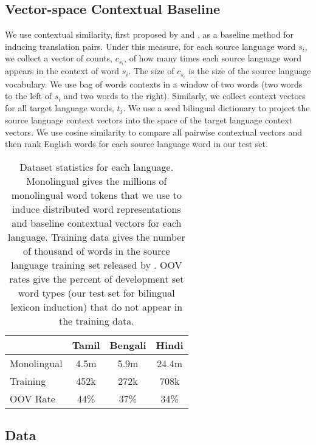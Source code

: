 \documentclass[11pt]{article}
\begin{document}
\subsection{Vector-space Contextual Baseline}\label{sec:contextbaseline}
We use contextual similarity, first proposed by  and , as a baseline method for inducing translation pairs. 
Under this measure, for each source language word $s_i$, we collect a vector of counts, $c_{s_i}$, of how many times each source language word appears in the context of word $s_i$. 
The size of $c_{s_i}$ is the size of the source language vocabulary.
We use bag of words contexts in a window of two words (two words to the left of $s_i$ and two words to the right). 
Similarly, we collect context vectors for all target language words, $t_j$. 
We use a seed bilingual dictionary to project the source language context vectors into the space of the target language context vectors.
We use cosine similarity to compare all pairwise contextual vectors and then rank English words for each source language word in our test set.


\begin{table}
\vspace{-.25cm}
\small
\begin{center}
\begin{tabular}{|l|c|c|c|}
\hline
{} & Tamil & Bengali & Hindi \\
\hline
Monolingual & 4.5m & 5.9m & 24.4m \\ %
Training & 452k & 272k & 708k \\
OOV Rate & 44\% & 37\% & 34\% \\
\hline
\end{tabular}
\end{center}
\caption{Dataset statistics for each language. Monolingual gives the millions of monolingual word tokens that we use to induce distributed word representations and baseline contextual vectors for each language. Training data gives the number of thousand of words in the source language training set released by . OOV rates give the percent of development set word types (our test set for bilingual lexicon induction) that do not appear in the training data.}\label{datastats}
\vspace{-.35cm}
\end{table}

\subsection{Data}
\end{document}
